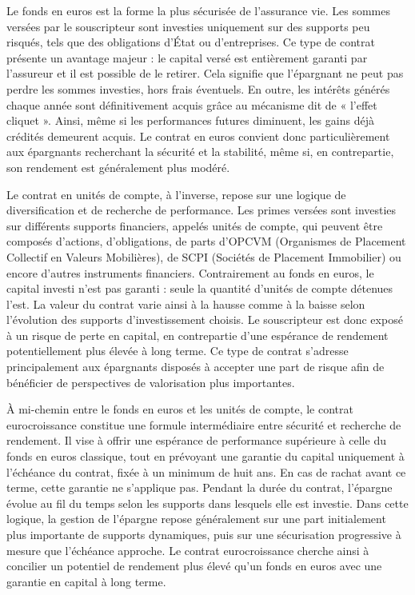 Le fonds en euros est la forme la plus sécurisée de l'assurance vie. Les sommes versées par le souscripteur sont investies uniquement sur des supports peu risqués, tels que des obligations d'État ou d'entreprises. Ce type de contrat présente un avantage majeur : le capital versé est entièrement garanti par l'assureur et il est possible de le retirer. Cela signifie que l'épargnant ne peut pas perdre les sommes investies, hors frais éventuels. En outre, les intérêts générés chaque année sont définitivement acquis grâce au mécanisme dit de « l'effet cliquet ». Ainsi, même si les performances futures diminuent, les gains déjà crédités demeurent acquis. Le contrat en euros convient donc particulièrement aux épargnants recherchant la sécurité et la stabilité, même si, en contrepartie, son rendement est généralement plus modéré.

Le contrat en unités de compte, à l'inverse, repose sur une logique de diversification et de recherche de performance. Les primes versées sont investies sur différents supports financiers, appelés unités de compte, qui peuvent être composés d'actions, d'obligations, de parts d'OPCVM (Organismes de Placement Collectif en Valeurs Mobilières), de SCPI (Sociétés de Placement Immobilier) ou encore d'autres instruments financiers. Contrairement au fonds en euros, le capital investi n'est pas garanti : seule la quantité d'unités de compte détenues l'est. La valeur du contrat varie ainsi à la hausse comme à la baisse selon l'évolution des supports d'investissement choisis. Le souscripteur est donc exposé à un risque de perte en capital, en contrepartie d'une espérance de rendement potentiellement plus élevée à long terme. Ce type de contrat s'adresse principalement aux épargnants disposés à accepter une part de risque afin de bénéficier de perspectives de valorisation plus importantes.

À mi-chemin entre le fonds en euros et les unités de compte, le contrat eurocroissance constitue une formule intermédiaire entre sécurité et recherche de rendement. Il vise à offrir une espérance de performance supérieure à celle du fonds en euros classique, tout en prévoyant une garantie du capital uniquement à l'échéance du contrat, fixée à un minimum de huit ans. En cas de rachat avant ce terme, cette garantie ne s'applique pas. Pendant la durée du contrat, l'épargne évolue au fil du temps selon les supports dans lesquels elle est investie. Dans cette logique, la gestion de l'épargne repose généralement sur une part initialement plus importante de supports dynamiques, puis sur une sécurisation progressive à mesure que l'échéance approche. Le contrat eurocroissance cherche ainsi à concilier un potentiel de rendement plus élevé qu'un fonds en euros avec une garantie en capital à long terme.

